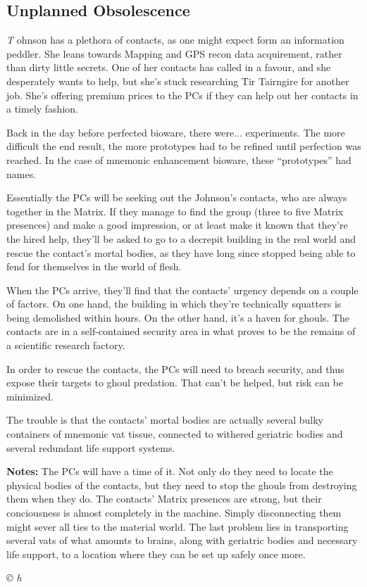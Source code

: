 \documentclass[letterpaper,onecolumn,10pt]{article}
\renewcommand{\textsc}[1]{{\fontspec{Friz Quadrata SC TT}\selectfont #1}}
\newcommand{\getyear}[1]{\StrLeft{#1}{4}}
\newenvironment{scenario}[6]
	{
		\section[#1 {\small\textsc{[#2]}}]{#1} \nopagebreak

		\noindent{\textsc{#2}}\nopagebreak

		\noindent\textit{#3}\nopagebreak
		\def\TMPSCENARIO{{\small\textit{©\getyear{#5}{} #4}}}
	}
	{\TMPSCENARIO}
\newcommand{\synopsis}{\textbf{Synopsis: }}
\newcommand{\notes}{\textbf{Notes: }}
\begin{document}
\begin{multicols}{2}
\begin{scenario}{Unplanned Obsolescence}
\synopsis The Johnson has a plethora of contacts, as one might expect form an information peddler. She leans towards Mapping and GPS recon data acquirement, rather than dirty little secrets. One of her contacts has called in a favour, and she desperately wants to help, but she's stuck researching Tir Tairngire for another job. She's offering premium prices to the PCs if they can help out her contacts in a timely fashion.

Back in the day before perfected bioware, there were... experiments. The more difficult the end result, the more prototypes had to be refined until perfection was reached. In the case of mnemonic enhancement bioware, these ``prototypes'' had names.

Essentially the PCs will be seeking out the Johnson's contacts, who are always together in the Matrix. If they manage to find the group (three to five Matrix presences) and make a good impression, or at least make it known that they're the hired help, they'll be asked to go to a decrepit building in the real world and rescue the contact's mortal bodies, as they have long since stopped being able to fend for themselves in the world of flesh.

When the PCs arrive, they'll find that the contacts' urgency depends on a couple of factors. On one hand, the building in which they're technically squatters is being demolished within hours. On the other hand, it's a haven for ghouls. The contacts are in a self-contained security area in what proves to be the remains of a scientific research factory.

In order to rescue the contacts, the PCs will need to breach security, and thus expose their targets to ghoul predation. That can't be helped, but risk can be minimized.

The trouble is that the contacts' mortal bodies are actually several bulky containers of mnemonic vat tissue, connected to withered geriatric bodies and several redundant life support systems.

\notes The PCs will have a time of it. Not only do they need to locate the physical bodies of the contacts, but they need to stop the ghouls from destroying them when they do. The contacts' Matrix presences are strong, but their conciousness is almost completely in the machine. Simply disconnecting them might sever all ties to the material world. The last problem lies in transporting several vats of what amounts to brains, along with geriatric bodies and necessary life support, to a location where they can be set up safely once more.


\end{scenario}
\end{multicols}
\end{document}
